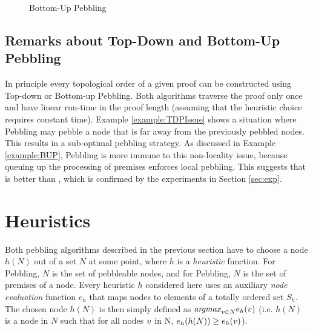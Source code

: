 \documentclass{llncs}
\newcommand{\nodedistanceThree}{0.6cm}
\begin{document}
\begin{example}
\begin{figure}[tb]
{\begin{minipage}{0.4\textwidth}
		\end{minipage}%
			}
		\caption{Bottom-Up Pebbling}
		\label{fig:BUP}
\end{figure}
\label{example:BUP}
\end{example}



\subsection{Remarks about Top-Down and Bottom-Up Pebbling} %
\label{sec:TDvsBU}

In principle every topological order of a given proof can be constructed using Top-down or Bottom-up Pebbling. Both algorithms traverse the proof only once and have linear run-time in the proof length (assuming that the heuristic choice requires constant time). Example \ref{example:TDPIssue} shows a situation where  Pebbling may pebble a node that is far away from the previously pebbled nodes. This results in a sub-optimal pebbling strategy.
As discussed in Example \ref{example:BUP},  Pebbling is more immune to this non-locality issue, because queuing up the processing of premises enforces local pebbling. This suggests that  is better than , which is confirmed by the experiments in Section \ref{sec:exp}.

\section{Heuristics}
\label{sec:heuristics}

Both pebbling algorithms described in the previous section have to choose a node $h(N)$ out of a set $N$ at some point, where $h$ is a \emph{heuristic} function. For  Pebbling, $N$ is the set of pebbleable nodes, and for  Pebbling, $N$ is the set of premises of a node. Every heuristic $h$ considered here uses an auxiliary \emph{node evaluation} function $e_h$ that maps nodes to elements of a totally ordered set $S_h$. The chosen node $h(N)$ is then simply defined as $\mathit{argmax}_{v \in N} e_h(v)$ (i.e. $h(N)$ is a node in $N$ such that for all nodes $v$ in N, $e_h(h(N)) \geq e_h(v)$).
\end{document}
